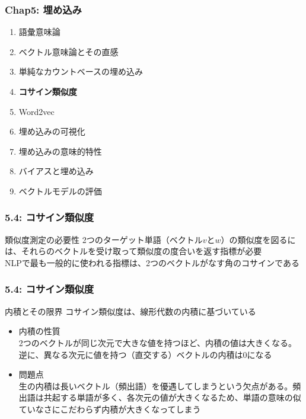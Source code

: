\documentclass[unicode,11pt]{beamer} %
\begin{document}

\begin{frame}
    \frametitle{Chap5: 埋め込み}
    \begin{block}{}
        \begin{enumerate}
            \item 語彙意味論
            \item ベクトル意味論とその直感
            \item 単純なカウントベースの埋め込み
            \item {\color{red}\textbf{コサイン類似度}}
            \item Word2vec
            \item 埋め込みの可視化
            \item 埋め込みの意味的特性
            \item バイアスと埋め込み
            \item ベクトルモデルの評価
        \end{enumerate}
    \end{block}
\end{frame}

\begin{frame}
    \frametitle{5.4: コサイン類似度}
    \begin{alertblock}{類似度測定の必要性}
        2つのターゲット単語（ベクトル$v$と$w$）の類似度を図るには、それらのベクトルを受け取って類似度の度合いを返す指標が必要
        \\NLPで最も一般的に使われる指標は、2つのベクトルがなす角のコサインである
    \end{alertblock}
\end{frame}

\begin{frame}
    \frametitle{5.4: コサイン類似度}
    \begin{alertblock}{内積とその限界}
        コサイン類似度は、線形代数の内積に基づいている
        \begin{itemize}
            \item 内積の性質\\2つのベクトルが同じ次元で大きな値を持つほど、内積の値は大きくなる。逆に、異なる次元に値を持つ（直交する）ベクトルの内積は0になる
            \item 問題点\\生の内積は長いベクトル（頻出語）を優遇してしまうという欠点がある。頻出語は共起する単語が多く、各次元の値が大きくなるため、単語の意味の似ていなさにこだわらず内積が大きくなってしまう
        \end{itemize}
    \end{alertblock}
\end{frame}
\end{document}
